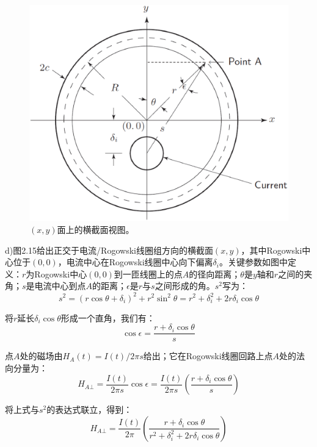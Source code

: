 \begin{figure}[htbp]
	\centering
	\includegraphics[scale=0.4]{chpt2/figs/fig2.15.eps}
	\caption{$(x,y)$面上的横截面视图。}
\end{figure}

d)图2.15给出正交于电流/Rogowski线圈组方向的横截面$(x,y)$，其中Rogowski中心位于$(0,0)$，电流中心在Rogowski线圈中心向下偏离$\delta_i$。关键参数如图中定义：$r$为Rogowski中心$(0,0)$到一匝线圈上的点$A$的径向距离；$\theta$是$y$轴和$r$之间的夹角；$s$是电流中心到点$A$的距离；$\epsilon$是$r$与$s$之间形成的角。$s^2$写为：
\begin{equation*}
s^2=(r\cos\theta+\delta_i)^2+r^2\sin^2\theta=r^2+\delta_i^2+2r\delta_i\cos\theta \tag{S9.7}
\end{equation*}

将$r$延长$\delta_i \cos\theta$形成一个直角，我们有：
\begin{equation*}
\cos\epsilon=\frac{r+\delta_i \cos\theta}{s} \tag{S9.8}
\end{equation*}

点$A$处的磁场由$H_A(t)=I(t)/2\pi s$给出；它在Rogowski线圈回路上点$A$处的法向分量为：
\begin{equation*}
H_{A\bot}=\frac{I(t)}{2\pi s}\cos\epsilon=\frac{I(t)}{2\pi s}(\frac{r+\delta_i \cos\theta}{s}) \tag{S9.9}
\end{equation*}

将上式与$s^2$的表达式联立，得到：
\begin{equation*}
H_{A\bot}=\frac{I(t)}{2\pi}\left(\frac{r+\delta_i \cos\theta}{r^2+\delta_i^2+2r\delta_i\cos\theta}\right) \tag{S9.10}
\end{equation*}

